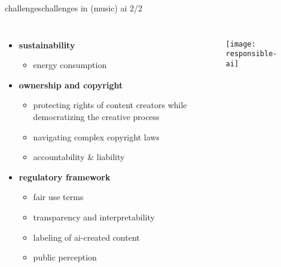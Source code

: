 \begin{frame}{challenges}{challenges in (music) ai 2/2}
    \vspace{-5mm}
    \begin{columns}
        \begin{itemize}
            \item   \textbf{sustainability}
                \begin{itemize}
                    \item energy consumption
                \end{itemize}
            \smallskip
            \item   \textbf{ownership and copyright}
                \begin{itemize}
                    \item protecting rights of content creators while democratizing the creative process
                    \item navigating complex copyright laws
                    \item accountability \& liability
                \end{itemize}
            \smallskip
            \item   \textbf{regulatory framework}
                \begin{itemize}
                    \item fair use terms
                    \item transparency and interpretability
                    \item labeling of ai-created content
                    \item public perception
                \end{itemize}
        \end{itemize}
        \vspace{20mm}
        \begin{figure}%
            \texttt{[image: responsible-ai]}%
        \end{figure}
    \end{columns}
\end{frame}
